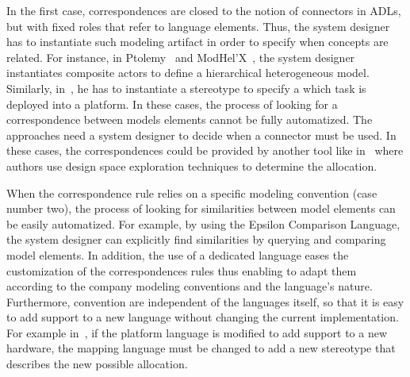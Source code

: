 In the first case, correspondences are closed to the notion of connectors in ADLs, but with fixed roles that refer to language elements. Thus, the system designer has to instantiate such modeling artifact in order to specify when concepts are related. For instance, in Ptolemy~\cite{ptoleframebib} and ModHel'X~\cite{modhelxbib}, the system designer instantiates composite actors to define a hierarchical heterogeneous model. Similarly, in~\cite{dinatale}, he has to instantiate a stereotype to specify a which task is deployed into a platform. In these cases, the process of looking for a correspondence between models elements cannot be fully automatized. The approaches need a system designer to decide when a connector must be used. In these cases, the correspondences could be provided by another tool like in~\cite{kofmanbib} where authors use design space exploration techniques to determine the allocation.%

When the correspondence rule relies on a specific modeling convention (case number two), the process of looking for similarities between model elements can be easily automatized. For example, by using the Epsilon Comparison Language, the system designer can explicitly find similarities by querying and comparing model elements. In addition, the use of a dedicated language eases the customization of the correspondences rules thus enabling to adapt them according to the company modeling conventions and the language's nature. Furthermore, convention are independent of the languages itself, so that it is easy to add support to a new language without changing the current implementation. For example in~\cite{dinatale}, if the platform language is modified to add support to a new hardware, the mapping language must be changed to add a new stereotype that describes the new possible allocation. 
			
			
			
						 
							
